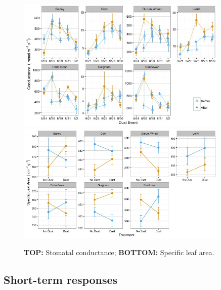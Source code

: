 \documentclass[]{scrartcl}
\begin{document}
\begin{figure}[!h]
  \centering
  \includegraphics[width=0.9\textwidth]{figures/stomcond.jpg}\\
  \includegraphics[width=0.9\textwidth]{figures/SLA.jpg}
  \caption{\textbf{TOP:} Stomatal conductance; \textbf{BOTTOM:} Specific leaf area. }
\end{figure}

\clearpage

\hypertarget{short-term-responses}{%
\subsection{Short-term responses}\label{short-term-responses}}
\end{document}
